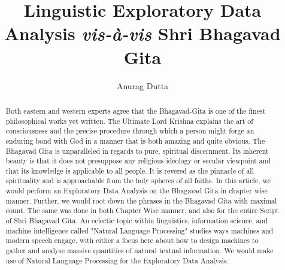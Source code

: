 \documentclass[runningheads]{llncs}
\begin{document}
%
\title{Linguistic Exploratory Data Analysis \textit{vis-à-vis} Shri Bhagavad Gita}
%
%
\author{Anurag Dutta}
%
%
%
\maketitle              %



\begin{abstract}
Both eastern and western experts agree that the Bhagavad-Gita is one of the finest philosophical works yet written. The Ultimate Lord Krishna explains the art of consciousness and the precise procedure through which a person might forge an enduring bond with God in a manner that is both amazing and quite obvious. The Bhagavad Gita is unparalleled in regards to pure, spiritual discernment. Its inherent beauty is that it does not presuppose any religious ideology or secular viewpoint and that its knowledge is applicable to all people. It is revered as the pinnacle of all spirituality and is approachable from the holy spheres of all faiths. In this article, we would perform an Exploratory Data Analysis on the Bhagavad Gita in chapter wise manner. Further, we would root down the phrases in the Bhagavad Gita with maximal count.  The same was done in both Chapter Wise manner, and also for the entire Script of Shri Bhagavad Gita. An eclectic topic within linguistics, information science, and machine intelligence called "Natural Language Processing" studies ways machines and modern speech engage, with either a focus here about how to design machines to gather and analyse massive quantities of natural textual information. We would make use of Natural Language Processing for the Exploratory Data Analysis. 
\end{abstract}
\end{document}
